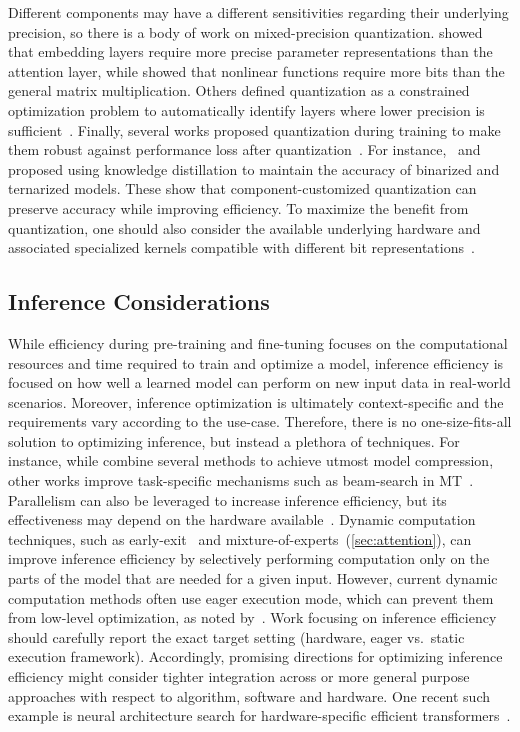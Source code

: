 Different components may have a different sensitivities regarding their underlying precision, so there is a body of work on mixed-precision quantization. 
\citet{shen_q-bert_2020} showed that embedding layers require more precise parameter representations than the attention layer, while \citet{kim_i-bert_2021} showed that nonlinear functions require more bits than the general matrix multiplication. Others defined quantization as a constrained optimization problem to automatically identify layers where lower precision is sufficient~\citep{pmlr-v139-hubara21a}. Finally, several works proposed quantization during training to make them robust against performance loss after quantization~\citep{zafrir_q8bert_2019,kim_i-bert_2021,stock2021training}. For instance,~\citet{bai_binarybert_2020} and \citet{zhang_ternarybert_2020} proposed using knowledge distillation to maintain the accuracy of binarized and ternarized models. These show that component-customized quantization can preserve accuracy while improving efficiency. To maximize the benefit from quantization, one should also consider the available underlying hardware and associated specialized kernels compatible with different bit representations~\citep{noune20228, kuzmin2022fp}.

\subsection{Inference Considerations} 

While efficiency during pre-training and fine-tuning focuses on the computational resources and time required to train and optimize a model, inference efficiency is focused on how well a learned model can perform on new input data in real-world scenarios. Moreover, inference optimization is ultimately context-specific and the requirements vary according to the use-case. Therefore, there is no one-size-fits-all solution to optimizing inference, but instead a plethora of techniques. For instance, while \citet{wu2022extreme} combine several methods to achieve utmost model compression, other works improve task-specific mechanisms such as beam-search in MT~\citep{peters-martins-2021-smoothing}. Parallelism can also be leveraged to increase inference efficiency, but its effectiveness may depend on the hardware available~\citep{Rajbhandari2022}. Dynamic computation techniques, such as early-exit~\citep{schwartz-etal-2020-right,xin-etal-2020-deebert} and mixture-of-experts~(\ref{sec:attention}), can improve inference efficiency by selectively performing computation only on the parts of the model that are needed for a given input. However, current dynamic computation methods often use eager execution mode, which can prevent them from low-level optimization, as noted by~\citet{xu2022survey}. Work focusing on inference efficiency should carefully report the exact target setting (hardware, eager vs.~static execution framework). Accordingly, promising directions for optimizing inference efficiency might consider tighter integration across or more general purpose approaches with respect to algorithm, software and hardware. One recent such example is neural architecture search for hardware-specific efficient transformers~\citep{wang-etal-2020-hat}.

